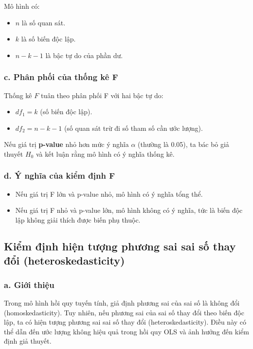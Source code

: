 Mô hình có:
\begin{itemize}
    \item \( n \) là số quan sát.
    \item \( k \) là số biến độc lập.
    \item \( n - k - 1 \) là bậc tự do của phần dư.
\end{itemize}

\subsubsection{c. Phân phối của thống kê F}
Thống kê \( F \) tuân theo phân phối F với hai bậc tự do:
\begin{itemize}
    \item \( df_1 = k \) (số biến độc lập).
    \item \( df_2 = n - k - 1 \) (số quan sát trừ đi số tham số cần ước lượng).
\end{itemize}

Nếu giá trị \textbf{p-value} nhỏ hơn mức ý nghĩa \( \alpha \) (thường là 0.05), ta bác bỏ giả thuyết \( H_0 \) và kết luận rằng mô hình có ý nghĩa thống kê.

\subsubsection{d. Ý nghĩa của kiểm định F}
\begin{itemize}
    \item Nếu giá trị F lớn và p-value nhỏ, mô hình có ý nghĩa tổng thể.
    \item Nếu giá trị F nhỏ và p-value lớn, mô hình không có ý nghĩa, tức là biến độc lập không giải thích được biến phụ thuộc.
\end{itemize}




\subsection{Kiểm định hiện tượng phương sai sai số thay đổi (heteroskedasticity)}
\subsubsection{a. Giới thiệu}
Trong mô hình hồi quy tuyến tính, giả định phương sai của sai số là không đổi (homoskedasticity). Tuy nhiên, nếu phương sai của sai số thay đổi theo biến độc lập, ta có hiện tượng phương sai sai số thay đổi (heteroskedasticity). Điều này có thể dẫn đến ước lượng không hiệu quả trong hồi quy OLS và ảnh hưởng đến kiểm định giả thuyết.

